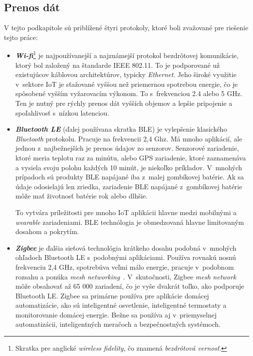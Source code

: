 \subsection{Prenos dát}\label{iot-trasport}
V tejto podkapitole sú priblížené štyri protokoly, ktoré boli zvažované pre riešenie tejto práce:
\begin{itemize}
    \item \textit{\textbf{Wi-fi}}\footnote{Skratka pre anglické \emph{wireless fidelity}, čo znamená \emph{bezdrôtová vernosť}.} je najpoužívanejší a najznámejší protokol bezdrôtovej komunikácie, ktorý bol založený na štandarde IEEE 802.11. 
    To je podporované už existujúcov káblovou architektúrov, typicky \emph{Ethernet}. 
    Jeho široké využitie v~sektore IoT je sťažované vyššou než priemernou spotrebou energie, čo je spôsobené vyšším vyžarovacím výkonom. 
    To s~frekvenciou 2.4 alebo 5 GHz. 
    Ten je nutný pre rýchly prenos dát vyšších objemov a lepšie pripojenie a spoľahlivosť s~nízkou latenciou.~\cite{elkhodr2016emerging}
    
    \item \textit{\textbf{Bluetooth LE}} (ďalej používana skratka BLE) je vylepšenie klasického \emph{Bluetooth} protokolu. 
    Pracuje na frekvencii 2,4 Ghz. 
    Má mnoho aplikácií, ale jednou z~najbežnejších je prenos údajov zo senzorov. 
    Senzorové zariadenie, ktoré meria teplotu raz za minútu, alebo GPS zariadenie, ktoré zaznamenáva a vysiela svoju polohu každých 10 minút, je niekoľko príkladov. 
    V~mnohých prípadoch sú produkty BLE napájané iba z~malej gombíkovej batérie. 
    Ak sa údaje odosielajú len zriedka, zariadenie BLE napájané z~gombíkovej batérie môže mať životnosť batérie rok alebo dlhšie.~\cite{elkhodr2016emerging}

    To vytvára príležitosti pre mnoho IoT aplikácii hlavne medzi mobilnými a \emph{wearable} zariadeniami.
    BLE technólogia je obmedzovaná hlavne limitovaným dosahom a pokrytím.~\cite{s17071467}\newpage

    \item \textit{\textbf{Zigbee}} je ďalšia sieťová technológia krátkeho dosahu podobná v~mnohých ohľadoch Bluetooth LE s~podobnými aplikáciami. 
    Používa rovnakú nosnú frekvenciu 2,4 GHz, spotrebúva veľmi málo energie, pracuje v~podobnom rozsahu a ponúka \textit{mesh networking}~\cite{elkhodr2016emerging}. 
    V~skutočnosti, Zigbee \textit{mesh network} môže obsahovať až 65 000 zariadení, čo je vyše dvakrát toľko, ako podporuje Bluetooth LE. 
    Zigbee sa primárne používa pre aplikácie domácej automatizácie, ako sú inteligentné osvetlenie, inteligentné termostaty a monitorovanie domácej energie. 
    Bežne sa používa aj v~priemyselnej automatizácii, inteligentných meračoch a bezpečnostných systémoch.~\cite{5942102}


\end{itemize}
